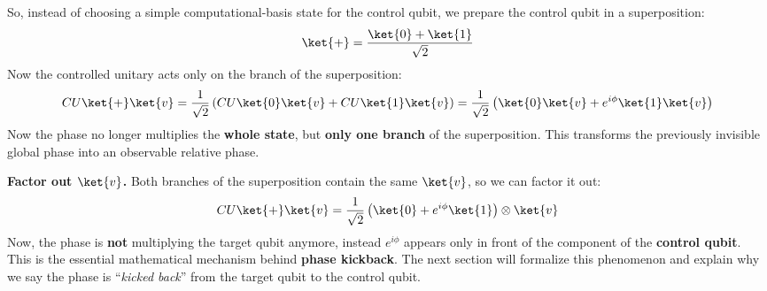 \highspace
So, instead of choosing a simple computational-basis state for the control qubit, we prepare the control qubit in a superposition:
\begin{equation*}
    \ket{+} = \frac{\ket{0} + \ket{1}}{\sqrt{2}}
\end{equation*}
Now the controlled unitary acts only on the  branch of the superposition:
\begin{equation*}
    CU\ket{+}\ket{v} = \frac{1}{\sqrt{2}} \left( CU\ket{0}\ket{v} + CU\ket{1}\ket{v} \right) = \frac{1}{\sqrt{2}} \left( \ket{0}\ket{v} + e^{i\phi}\ket{1}\ket{v} \right)
\end{equation*}
Now the phase no longer multiplies the \textbf{whole state}, but \textbf{only one branch} of the superposition. This transforms the previously invisible global phase into an observable relative phase.

\highspace
\textcolor{Green3}{ \textbf{Factor out $\ket{v}$.}} Both branches of the superposition contain the same $\ket{v}$, so we can factor it out:
\begin{equation*}
    CU\ket{+}\ket{v} = \frac{1}{\sqrt{2}} \left( \ket{0} + e^{i\phi}\ket{1} \right) \otimes \ket{v}
\end{equation*}
Now, the phase is \textbf{not} multiplying the target qubit anymore, instead $e^{i\phi}$ appears only in front of the  component of the \textbf{control qubit}. This is the essential mathematical mechanism behind \textbf{phase kickback}. The next section will formalize this phenomenon and explain why we say the phase is ``\emph{kicked back}'' from the target qubit to the control qubit.